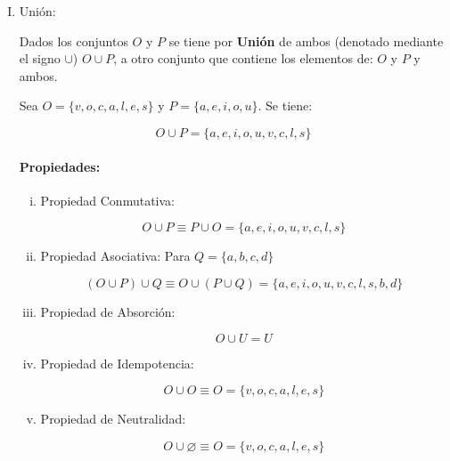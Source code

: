 \begin{enumerate}[I.]
\item Unión:
{
 Dados los conjuntos $O$ y $P$ se tiene por \textbf{Unión} de ambos 
(denotado
mediante el signo $\cup$) $O \cup P$, a otro conjunto que contiene los elementos
de: $O$ y $P$ y ambos.

\ejem Sea $O = \{v,o,c,a,l,e,s\}$ y $ P = \{a,e,i,o,u\}$. Se tiene:

\begin{equation}
O \cup P = \{a,e,i,o,u,v,c,l,s\}
\end{equation}

\paragraph*{Propiedades:}

\begin{enumerate}[i.]
\item Propiedad Conmutativa:

\begin{equation}
O \cup P \equiv P \cup O = \{a,e,i,o,u,v,c,l,s\}
\end{equation}
 
\item Propiedad Asociativa: Para $Q = \{a,b,c,d\}$

\begin{equation}
(O \cup P) \cup Q \equiv O \cup (P \cup Q) = \{a,e,i,o,u,v,c,l,s,b,d\}
\end{equation}

\item Propiedad de Absorción:

\begin{equation}
O \cup U = U
\end{equation}

\item Propiedad de Idempotencia:

\begin{equation}
O \cup O \equiv O = \{v,o,c,a,l,e,s\}
\end{equation}

\item Propiedad de Neutralidad:

\begin{equation}
O \cup \varnothing \equiv O = \{v,o,c,a,l,e,s\}
\end{equation}

\end{enumerate}

}
\end{enumerate}
